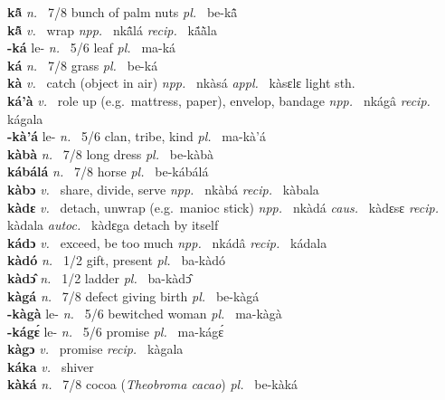 \noindent
{\bfseries kã̂}  {\itshape n.~} 7/8 bunch of palm nuts {\itshape pl.~} be-kã̂    \\ 
{\bfseries kã̂}  {\itshape v.~} wrap   {\itshape npp.~} nkã̂lá {\itshape recip.~} kã́ã̀la  \\ 
{\bfseries -ká} le- {\itshape n.~} 5/6 leaf {\itshape pl.~} ma-ká    \\ 
{\bfseries ká}  {\itshape n.~} 7/8 grass {\itshape pl.~} be-ká    \\ 
{\bfseries kà}  {\itshape v.~} catch (object in air)   {\itshape npp.~} nkàsá {\itshape appl.~} kàsɛlɛ light sth.  \\ 
{\bfseries ká'à}  {\itshape v.~} role up (e.g.\ mattress, paper), envelop, bandage   {\itshape npp.~} nkágâ {\itshape recip.~} kágala  \\ 
{\bfseries -kà'á} le- {\itshape n.~} 5/6 clan, tribe, kind {\itshape pl.~} ma-kà'á    \\ 
{\bfseries kàbà}  {\itshape n.~} 7/8 long dress {\itshape pl.~} be-kàbà    \\ 
{\bfseries kábálá}  {\itshape n.~} 7/8 horse {\itshape pl.~} be-kábálá    \\ 
{\bfseries kàbɔ}  {\itshape v.~} share, divide, serve   {\itshape npp.~} nkàbá {\itshape recip.~} kàbala  \\ 
{\bfseries kàdɛ}  {\itshape v.~} detach, unwrap (e.g.\ manioc stick)   {\itshape npp.~} nkàdá {\itshape caus.~} kàdɛsɛ {\itshape recip.~} kàdala {\itshape autoc.~} kàdɛga detach by itself  \\ 
{\bfseries kádɔ}  {\itshape v.~} exceed, be too much   {\itshape npp.~} nkádâ {\itshape recip.~} kádala  \\ 
{\bfseries kàdó}  {\itshape n.~} 1/2 gift, present {\itshape pl.~} ba-kàdó    \\ 
{\bfseries kàdɔ̂}  {\itshape n.~} 1/2 ladder {\itshape pl.~} ba-kàdɔ̂   \\ 
{\bfseries kàgá}  {\itshape n.~} 7/8 defect giving birth {\itshape pl.~} be-kàgá    \\ 
{\bfseries -kàgà} le- {\itshape n.~} 5/6 bewitched woman {\itshape pl.~} ma-kàgà    \\ 
{\bfseries -kágɛ́} le- {\itshape n.~} 5/6 promise {\itshape pl.~} ma-kágɛ́    \\ 
{\bfseries kàgɔ}  {\itshape v.~} promise   {\itshape recip.~} kàgala  \\ 
{\bfseries káka}  {\itshape v.~} shiver    \\ 
{\bfseries kàká}  {\itshape n.~} 7/8 cocoa ({\itshape Theobroma cacao}) {\itshape pl.~} be-kàká    \\ 
